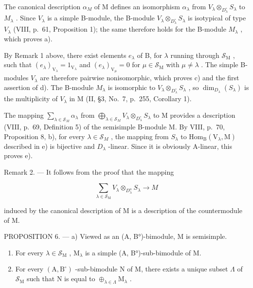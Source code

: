 The canonical description \(\alpha_{M}\) of M defines an isomorphism \(\alpha_{\lambda}\) from \(V_{\lambda}\otimes_{D_{\lambda}^{\circ}}S_{\lambda}\) to \(M_{\lambda}\) . Since \(V_{\lambda}\) is a simple B-module, the B-module \(V_{\lambda}\otimes_{D_{\lambda}^{\circ}}S_{\lambda}\) is isotypical of type \(V_{\lambda}\) (VIII, p.~61, Proposition 1); the same therefore holds for the B-module \(M_{\lambda}\) , which proves a).

By Remark 1 above, there exist elements \(e_{\lambda}\) of B, for \(\lambda\) running through \(\mathcal{S}_{\mathrm{M}}\) , such that \((e_{\lambda})_{\mathrm{V}_{\lambda}} = 1_{\mathrm{V}_{\lambda}}\) and \((e_{\lambda})_{\mathrm{V}_{\mu}} = 0\) for \(\mu \in \mathcal{S}_{\mathrm{M}}\) with \(\mu \neq \lambda\) . The simple B-modules \(V_{\lambda}\) are therefore pairwise nonisomorphic, which proves c) and the first assertion of d). The B-module \(M_{\lambda}\) is isomorphic to \(V_{\lambda} \otimes_{D_{\lambda}^{\circ}} S_{\lambda}\) , so \(\dim_{D_{\lambda}}(S_{\lambda})\) is the multiplicity of \(V_{\lambda}\) in M (II, §3, No.~7, p.~255, Corollary 1).

The mapping \(\sum_{\lambda\in\mathcal{S}_{M}}\alpha_{\lambda}\) from \(\bigoplus_{\lambda\in\mathcal{S}_{M}}V_{\lambda}\otimes_{D_{\lambda}^{\circ}}S_{\lambda}\) to M provides a description (VIII, p.~69, Definition 5) of the semisimple B-module M. By VIII, p.~70, Proposition 8, b), for every \(\lambda\in\mathcal{S}_{M}\) , the mapping from \(S_{\lambda}\) to \(\mathrm{Hom}_{\mathrm{B}}(\mathrm{V}_{\lambda},\mathrm{M})\) described in e) is bijective and \(D_{\lambda}\) -linear. Since it is obviously A-linear, this proves e).

Remark 2. --- It follows from the proof that the mapping

\[
\sum_ {\lambda \in \mathcal {S} _ {\mathrm{M}}} V _ {\lambda} \otimes_ {D _ {\lambda} ^ {\mathrm{o}}} S _ {\lambda} \longrightarrow M
\]

induced by the canonical description of M is a description of the countermodule of M.

PROPOSITION 6. --- a) Viewed as an (A, B°)-bimodule, M is semisimple.

\begin{enumerate}
\def\labelenumi{\alph{enumi})}
\setcounter{enumi}{1}
\item
  For every \(\lambda \in \mathcal{S}_{\mathrm{M}}\) , \(\mathrm{M}_{\lambda}\) is a simple (A, B°)-sub-bimodule of M.
\item
  For every \((\mathrm{A},\mathrm{B}^{\circ})\) -sub-bimodule N of M, there exists a unique subset \(\Lambda\) of \(\mathcal{S}_{\mathrm{M}}\) such that N is equal to \(\oplus_{\lambda \in \Lambda}\mathrm{M}_{\lambda}\) .
\end{enumerate}

